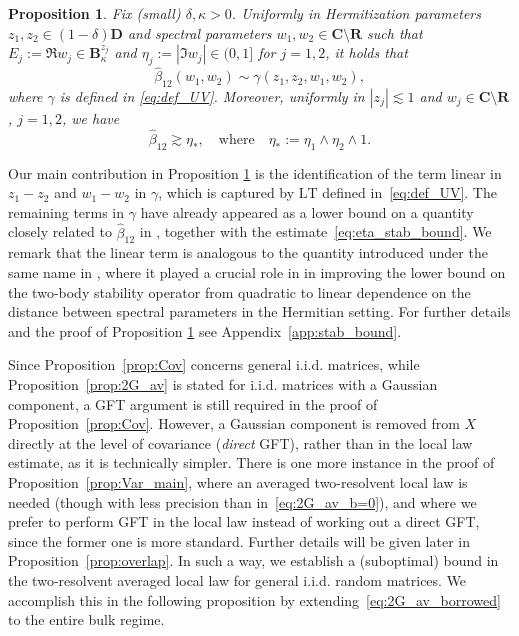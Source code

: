 \documentclass[10pt]{amsart}
\newtheorem{proposition}[theorem]{Proposition}
\numberwithin{equation}{section}
\newcommand{\R}{\mathbf{R}}
\newcommand{\C}{\mathbf{C}}
\begin{document}
\begin{proposition}\label{prop:stab_bound} Fix (small) $\delta,\kappa>0$. Uniformly in Hermitization parameters $z_1,z_2\in (1-\delta)\mathbf{D}$ and spectral parameters $w_1,w_2\in \C\setminus\R$ such that $E_j:=\Re w_j\in\mathbf{B}_\kappa^{z_j}$ and $\eta_j:=|\Im w_j|\in (0,1]$ for $j=1,2$, it holds that
\begin{equation}
\widehat{\beta}_{12}(w_1,w_2)\sim \gamma(z_1,z_2,w_1,w_2),
\label{eq:stab_LT}
\end{equation}  
where 
$\gamma$ is defined in \eqref{eq:def_UV}. Moreover, uniformly in $|z_j|\lesssim 1$ and $w_j\in\C\setminus\R$, $j=1,2$, we have
\begin{equation}
\widehat{\beta}_{12}\gtrsim \eta_*,\quad \text{where}\quad\eta_*:=\eta_1\wedge\eta_2\wedge 1.
\label{eq:eta_stab_bound}
\end{equation}
\end{proposition}

Our main contribution in Proposition \ref{prop:stab_bound} is the identification of the term linear in $z_1-z_2$ and $w_1-w_2$ in $\gamma$, which is captured by $\mathrm{LT}$ defined in~\eqref{eq:def_UV}. The remaining terms in $\gamma$ have already appeared as a lower bound on a quantity closely related to $\widehat{\beta}_{12}$ in \cite[Lemma~6.1]{macroCLT_real}, together with the estimate~\eqref{eq:eta_stab_bound}. We remark that the linear term is analogous to the quantity introduced under the same name in \cite[Eq.(2.17)]{eigenv_decorr}, where it played a crucial role in \cite[Proposition~3.1]{eigenv_decorr} in improving the lower bound on the two-body stability operator from quadratic to linear dependence on the distance between spectral parameters in the Hermitian setting. For further details and the proof of Proposition \ref{prop:stab_bound} see Appendix~\ref{app:stab_bound}.

Since Proposition~\ref{prop:Cov} concerns general i.i.d. matrices, while Proposition~\ref{prop:2G_av} is stated for i.i.d. matrices with a Gaussian component, a GFT argument is still required in the proof of Proposition~\ref{prop:Cov}. However, a Gaussian component is removed from $X$ directly at the level of covariance (\emph{direct} GFT), rather than in the local law estimate, as it is technically simpler. There is one more instance in the proof of Proposition~\ref{prop:Var_main}, where an averaged two-resolvent local law is needed (though with less precision than in~\eqref{eq:2G_av_b=0}), and where we prefer to perform GFT in the local law instead of working out a direct GFT, since the former one is more standard. Further details will be given later in Proposition~\ref{prop:overlap}. In such a way, we establish a (suboptimal) bound in the two-resolvent averaged local law for general i.i.d. random matrices. We accomplish this in the following proposition by extending~\eqref{eq:2G_av_borrowed} to the entire bulk regime. 
\end{document}
